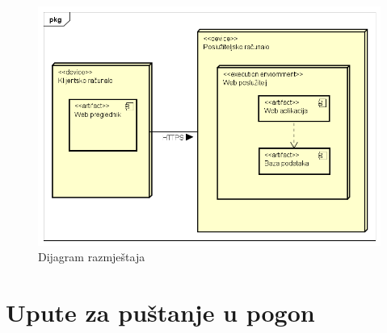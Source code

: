 			\begin{figure}[H]
				\includegraphics[scale=0.7]{dijagrami/dijrazm1.PNG} %
				\centering
				\caption{Dijagram razmještaja}
				\label{fig:dijstanj1}
			\end{figure}
			
			\eject 
		
		\section{Upute za puštanje u pogon}
		
